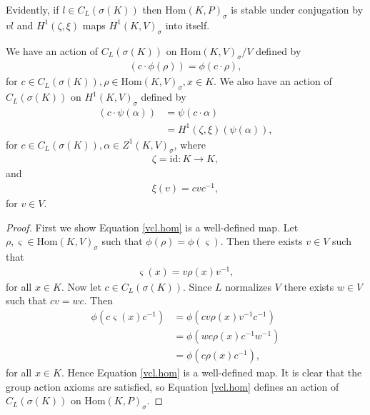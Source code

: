 	Evidently, if $l \in C_L\left(\sigma(K)\right)$ then $\mathrm{Hom}(K, P)_\sigma$ is stable under conjugation by $vl$ and $H^1(\zeta, \xi)$ maps $H^1(K, V)_{\sigma}$ into itself.

	\begin{lemma} We have an action of $C_L(\sigma(K))$ on $\mathrm{Hom}(K, V)_\sigma / V$ defined by
		\begin{align} \label{vcl.hom}
			(c \cdot \phi(\rho)) = \phi\left(c \cdot \rho \right),
		\end{align}
		for $c \in C_L(\sigma(K)), \rho \in \mathrm{Hom}(K, V)_\sigma, x \in K$. We also have an action of $C_L(\sigma(K))$ on $H^1(K, V)_\sigma$ defined by
		\begin{align} \label{cl.h1}
			\left(c \cdot \psi(\alpha)\right)
			&= \psi \left(c \cdot \alpha \right) \\
			&= H^1(\zeta, \xi)\left(\psi(\alpha)\right), 
		\end{align}
		for $c \in C_L(\sigma(K)), \alpha \in Z^1(K, V)_\sigma$, where
		\begin{align*}
		\zeta = \mathrm{id}: K \rightarrow K,
	\end{align*}
	and 
	\begin{align*}
		\xi(v) = cvc^{-1},
	\end{align*}
	for $v \in V$.
	\end{lemma}
\begin{proof}
	First we show Equation \ref{vcl.hom} is a well-defined map. Let $\rho, \varsigma \in \mathrm{Hom}(K, V)_\sigma$ such that $\phi(\rho) = \phi(\varsigma)$. Then there exists $v \in V$ such that
	\begin{align*} \varsigma(x) = v\rho(x)v^{-1}, \end{align*}
		for all $x \in K$. Now let $c \in C_L(\sigma(K))$. Since $L$ normalizes $V$ there exists $w \in V$ such that $cv = wc$. Then
		\begin{align*}
			\phi \left(c \varsigma(x)c^{-1}\right) 
			&= \phi \left(cv \rho(x) v^{-1}c^{-1}\right) \\
			&= \phi \left(wc \rho(x) c^{-1}w^{-1}\right) \\
			&= \phi \left(c \rho(x) c^{-1}\right),
		\end{align*}
		for all $x \in K$. Hence Equation \ref{vcl.hom} is a well-defined map. It is clear that the group action axioms are satisfied, so Equation \ref{vcl.hom} defines an action of $C_L(\sigma(K))$ on $\mathrm{Hom}(K, P)_\sigma$.


\end{proof}

